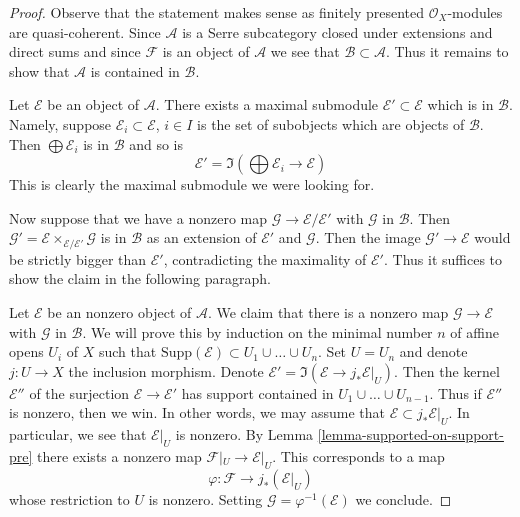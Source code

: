 \begin{proof}
Observe that the statement makes sense as finitely presented
$\mathcal{O}_X$-modules are quasi-coherent.
Since $\mathcal{A}$ is a Serre subcategory closed under extensions and
direct sums and since $\mathcal{F}$ is an object of $\mathcal{A}$
we see that $\mathcal{B} \subset \mathcal{A}$. Thus it remains to
show that $\mathcal{A}$ is contained in $\mathcal{B}$.

\medskip\noindent
Let $\mathcal{E}$ be an object of $\mathcal{A}$. There exists
a maximal submodule $\mathcal{E}' \subset \mathcal{E}$
which is in $\mathcal{B}$. Namely, suppose
$\mathcal{E}_i \subset \mathcal{E}$, $i \in I$ is the set of
subobjects which are objects of $\mathcal{B}$. Then
$\bigoplus \mathcal{E}_i$ is in $\mathcal{B}$ and so is
$$
\mathcal{E}' = \Im(\bigoplus \mathcal{E}_i \longrightarrow \mathcal{E})
$$
This is clearly the maximal submodule we were looking for.

\medskip\noindent
Now suppose that we have a nonzero map
$\mathcal{G} \to \mathcal{E}/\mathcal{E}'$
with $\mathcal{G}$ in $\mathcal{B}$. Then
$\mathcal{G}' = \mathcal{E} \times_{\mathcal{E}/\mathcal{E}'} \mathcal{G}$
is in $\mathcal{B}$ as an extension of $\mathcal{E}'$ and $\mathcal{G}$.
Then the image $\mathcal{G}' \to \mathcal{E}$ would be strictly
bigger than $\mathcal{E}'$, contradicting the maximality of $\mathcal{E}'$.
Thus it suffices to show the claim in the following paragraph.

\medskip\noindent
Let $\mathcal{E}$ be an nonzero object of $\mathcal{A}$. We claim that there
is a nonzero map $\mathcal{G} \to \mathcal{E}$ with $\mathcal{G}$ in
$\mathcal{B}$. We will prove this by induction on the minimal
number $n$ of affine opens $U_i$ of $X$ such that
$\text{Supp}(\mathcal{E}) \subset U_1 \cup \ldots \cup U_n$.
Set $U = U_n$ and denote $j : U \to X$ the inclusion morphism.
Denote $\mathcal{E}' = \Im(\mathcal{E} \to j_*\mathcal{E}|_U)$.
Then the kernel $\mathcal{E}''$ of the surjection
$\mathcal{E} \to \mathcal{E}'$ has support contained in
$U_1 \cup \ldots \cup U_{n - 1}$. Thus if $\mathcal{E}''$ is nonzero,
then we win. In other words, we may assume that
$\mathcal{E} \subset j_*\mathcal{E}|_U$.
In particular, we see that $\mathcal{E}|_U$ is nonzero.
By Lemma \ref{lemma-supported-on-support-pre}
there exists a nonzero map $\mathcal{F}|_U \to \mathcal{E}|_U$.
This corresponds to a map
$$
\varphi : \mathcal{F} \longrightarrow j_*(\mathcal{E}|_U)
$$
whose restriction to $U$ is nonzero.
Setting $\mathcal{G} = \varphi^{-1}(\mathcal{E})$ we conclude.
\end{proof}

